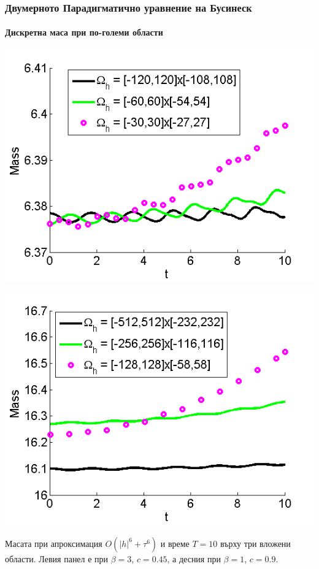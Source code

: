 \documentclass{beamer}
\begin{document}

\begin{frame}
\frametitle{Двумерното Парадигматично уравнение на Бусинеск}
\framesubtitle{Дискретна маса при по-големи области}
\begin{center}\vspace{0.4cm}
	\begin{minipage}[b]{0.49\linewidth}
		\includegraphics[width=\linewidth]{MassTaylor_120_60_30_ZB1_bt3_c045_h020_O(h^6).png}
	\end{minipage}	
	\begin{minipage}[b]{0.49\linewidth}
		\includegraphics[width=\linewidth]{MassTaylor_512_256_128_ZB1_bt1_c090_h040_O(h^6).png}
		
	\end{minipage}
\end{center}
Масата при апроксимация $O(|h|^6 + \tau^6)$ и време $T = 10$ върху три вложени области. Левия панел е при $\beta=3$, $c = 0.45$, а десния при $\beta=1$, $c = 0.9$.
\end{frame}
\end{document}
